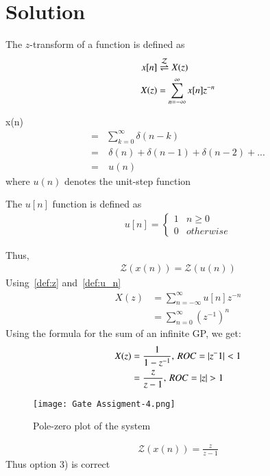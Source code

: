 \documentclass[journal,12pt,twocolumn]{IEEEtran}
\begin{document}
\section*{Solution}
\begin{definition}\label{def:z}
    The $z$-transform of a function is defined as
    \begin{align}
        x[n] &\overset{\mathcal{Z}}{ \rightleftharpoons} X(z)\\
        X(z) &=\sum_{n=-\infty}^{\infty} x[n]z^{-n}
    \end{align}
\end{definition}
x(n)
\begin{align}
    =&\sum_{k=0}^{\infty} \delta (n-k)\\
    =&\:\delta (n)+\delta (n-1)+\delta (n-2)+...\\
    =&\:u(n)
\end{align}
where $u(n)$ denotes the unit-step function\\
\begin{definition}\label{def:u_n}
    The $u[n]$ function is defined as
    \begin{align}
        u[n] = 
        \begin{cases}
        1 & n\geq0\\
        0 & otherwise
        \end{cases}
    \end{align}
\end{definition}
Thus,
\begin{align}
    \mathcal{Z}(x(n))=\mathcal{Z}(u(n))
\end{align}
Using~\eqref{def:z} and~\eqref{def:u_n}
\begin{align}
    X(z)&=\sum_{n=-\infty}^{\infty} u[n]z^{-n}\\
    &=\sum_{n=0}^{\infty} ({z^{-1}})^n
\end{align}
Using the formula for the sum of an infinite GP, we get:
\begin{align}
    X(z)&=\frac{1}{1-z^{-1}},\, ROC=\vert z^-1\vert < 1\\
    &=\frac{z}{z-1},\, ROC=\vert z\vert>1
\end{align}
\begin{figure}[!ht]
    \centering
    \texttt{[image: Gate Assigment-4.png]}
    \caption{Pole-zero plot of the system}
    \label{a}
\end{figure}
\begin{align}
    \mathcal{Z}(x(n))=\frac{z}{z-1}
\end{align}
Thus option 3) is correct
\end{document}
